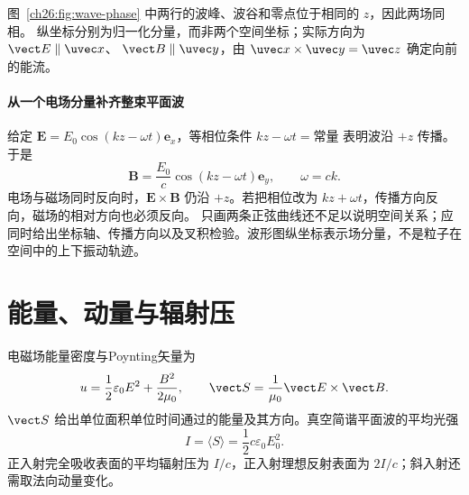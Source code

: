 \begin{center}
\label{ch26:fig:wave-phase}
\end{center}
图~\ref{ch26:fig:wave-phase} 中两行的波峰、波谷和零点位于相同的 $z$，因此两场同相。
纵坐标分别为归一化分量，而非两个空间坐标；实际方向为 $\vect E\parallel\uvec x$、
$\vect B\parallel\uvec y$，由 $\uvec x\times\uvec y=\uvec z$ 确定向前的能流。


\paragraph{从一个电场分量补齐整束平面波}
给定 $\boldsymbol E=E_0\cos(kz-\omega t)\boldsymbol e_x$，等相位条件 $kz-\omega t=\text{常量}$ 表明波沿 $+z$ 传播。于是
\[
 \boldsymbol B=\frac{E_0}{c}\cos(kz-\omega t)\boldsymbol e_y,
 \qquad \omega=ck.
\]
电场与磁场同时反向时，$\boldsymbol E\times\boldsymbol B$ 仍沿 $+z$。若把相位改为 $kz+\omega t$，传播方向反向，磁场的相对方向也必须反向。
只画两条正弦曲线还不足以说明空间关系；应同时给出坐标轴、传播方向以及叉积检验。波形图纵坐标表示场分量，不是粒子在空间中的上下振动轨迹。

\section{能量、动量与辐射压}

电磁场能量密度与Poynting矢量为
\begin{equation}
 u=\frac12\varepsilon_0E^2+\frac{B^2}{2\mu_0},
 \qquad \vect S=\frac1{\mu_0}\vect E\times\vect B.
\end{equation}
$\vect S$ 给出单位面积单位时间通过的能量及其方向。真空简谐平面波的平均光强
\begin{equation}
 I=\langle S\rangle=\frac12c\varepsilon_0E_0^2.
\end{equation}
正入射完全吸收表面的平均辐射压为 $I/c$，正入射理想反射表面为 $2I/c$；斜入射还需取法向动量变化。

